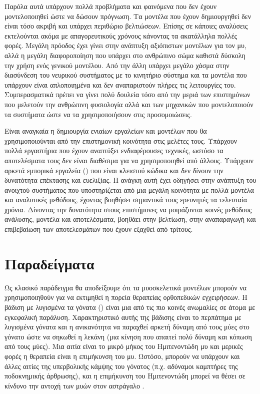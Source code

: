 Παρόλα αυτά υπάρχουν πολλά προβλήματα και φαινόμενα που δεν έχουν μοντελοποιηθεί ώστε να δώσουν πρόγνωση. Τα μοντέλα που έχουν δημιουργηθεί δεν είναι τόσο ακριβή και υπάρχει περιθώριο βελτιώσεων. Επίσης σε κάποιες αναλύσεις εκτελούνται ακόμα με απαγορευτικούς χρόνους κάνοντας τα ακατάλληλα πολλές φορές. Μεγάλη πρόοδος έχει γίνει στην ανάπτυξη αξιόπιστων μοντέλων για τον μυ, αλλά η μεγάλη διαφοροποίηση που υπάρχει στο ανθρώπινο σώμα καθιστά δύσκολη την χρήση ενός γενικού μοντέλου. Από την άλλη υπάρχει μεγάλο χάσμα στην διασύνδεση του νευρικού συστήματος με το κινητήριο σύστημα και τα μοντέλα που υπάρχουν είναι απλοποιημένα και δεν αναπαριστούν πλήρες τις λειτουργίες του. Συμπερασματικά πρέπει να γίνει πολύ δουλεία τόσο από την μεριά των επιστημόνων που μελετούν την ανθρώπινη φυσιολογία αλλά και των μηχανικών που μοντελοποιούν τα συστήματα ώστε να τα χρησιμοποιήσουν στις προσομοιώσεις.

Είναι αναγκαία η δημιουργία ενιαίων εργαλείων και μοντέλων που θα χρησιμοποιούνται από την επιστημονική κοινότητα στις μελέτες τους. Υπάρχουν πολλά εργαστήρια που έχουν αναπτύξει ενδιαφέρουσες τεχνικές, ωστόσο τα αποτελέσματα τους δεν είναι διαθέσιμα για να χρησιμοποιηθεί από άλλους. Υπάρχουν αρκετά εμπορικά εργαλεία () που είναι κλειστού κώδικα και δεν δίνουν την δυνατότητα επέκτασης και ευελιξίας. Η ανάγκη αυτή έχει οδηγήσει στην ανάπτυξη του ανοιχτού συστήματος  που υποστηρίζεται από μια μεγάλη κοινότητα με πολλά μοντέλα και αναλυτικές μεθόδους, έχοντας βοηθήσει σημαντικά τους ερευνητές τα τελευταία χρόνια. Δίνοντας την δυνατότητα στους επιστήμονες να μοιράζονται κοινές μεθόδους ανάλυσης, μοντέλα και αποτελέσματα, βοηθάει στην βελτίωση, στην αναπαραγωγή και επιβεβαίωση των αποτελεσμάτων που έχουν εξαχθεί από τρίτους.

\section*{Παραδείγματα}

Ως κλασικό παράδειγμα θα αποδείξουμε ότι τα μυοσκελετικά μοντέλων μπορούν να χρησιμοποιηθούν για να εκτιμηθεί η πορεία θεραπείας ορθοπεδικών εγχειρήσεων. Η βάδιση με λυγισμένα τα γόνατα () είναι μια από τις πιο κοινές ανωμαλίες σε άτομα με εγκεφαλική παράλυση. Χαρακτηριστικό αυτής της βάδισης είναι το περπάτημα με λυγισμένα γόνατα και η ανικανότητα να παραχθεί αρκετή δύναμη από τους μύες στο γόνατο ώστε να σηκωθεί η λεκάνη (μια κίνηση που απαιτεί πολύ δύναμη και κόπωση από τους μύες).  Μια αιτία είναι το μικρό μήκος του Ημιτενοντώδη μυ και μερικές φορές η θεραπεία είναι η επιμήκυνση του μυ. Ωστόσο, μπορούν να υπάρχουν και άλλες αιτίες της υπερβολικής κάμψης του γόνατος (π.χ. αδύναμοι καμπτήρες της ποδοκνημικής άρθρωσης), και η επιμήκυνση του Ημιτενοντώδη μπορεί να θέσει σε κίνδυνο την αντοχή των μυών στον αστράγαλο \cite{arnolda06}.

